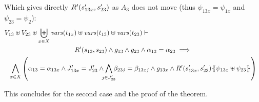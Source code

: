 \documentclass[runningheads]{llncs}
\begin{document}
\begin{enumerate}

Which gives directly $R'{\left(s'_{1 3x}, s'_{23}\right)}$ as $A_3$ does not move (thus $\psi_{1 3x}=\psi_{1 x}$ and  $\psi_{23} =\psi_{2}$):
\begin{multline*}
  V_{13} \uplus V_{23} \uplus  \biguplus_{x\in X}\fvars{t_{1x}}  \uplus \fvars{t_{13}} \uplus \fvars{t_{23}} 
\vdash \hspace{6cm}\\  R'\mpar{s_{13}, s_{23}} \wedge 	g_{13} \wedge g_{23} \wedge \alpha_{13} = \alpha_{23} 
\implies \\
\bigwedge_{x\in X}
\mpar{
 \alpha_{13}=\alpha_{1 3x} \land
J'_{13x}  = J'_{23}  \land \bigwedge_\subbox{j \in  J'_{23}} \beta_{23j} = \beta_{13xj}\land g_{1 3x} \land
 R'\mpar{s'_{1 3x}, s'_{23}}\psubst{\psi_{1 3x} \uplus \psi_{23}}}
\end{multline*}

This concludes for the second case and the proof of the theorem.

\end{enumerate}
\end{document}
